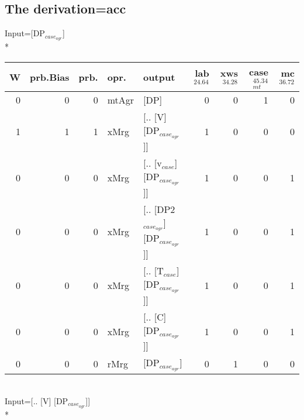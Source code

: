 \subsection{The derivation=acc}
\begingroup\scriptsize Input=[DP$_{case_{agr}}$]\\*
\begin{tabularx}{\linewidth}{rrrlXrrrr}
\hline
   W &   prb.Bias &   prb. & opr.    & output                            &   lab$^{24.64}$ &   xws$^{34.28}$ &   case$_{mt}^{45.34}$ &   mc$^{36.72}$ \\
\hline
   0 &       0 &   0 & mtAgr & [DP]                              &             0 &             0 &                 1 &            0 \\
   1 &       1 &   1 & xMrg  & [.. [V] [DP$_{case_{agr}}$]]            &             1 &             0 &                 0 &            0 \\
   0 &       0 &   0 & xMrg  & [.. [v$_{case}$] [DP$_{case_{agr}}$]]       &             1 &             0 &                 0 &            1 \\
   0 &       0 &   0 & xMrg  & [.. [DP2$_{case_{agr}}$] [DP$_{case_{agr}}$]] &             1 &             0 &                 0 &            1 \\
   0 &       0 &   0 & xMrg  & [.. [T$_{case}$] [DP$_{case_{agr}}$]]       &             1 &             0 &                 0 &            1 \\
   0 &       0 &   0 & xMrg  & [.. [C] [DP$_{case_{agr}}$]]            &             1 &             0 &                 0 &            1 \\
   0 &       0 &   0 & rMrg  & [DP$_{case_{agr}}$]                     &             0 &             1 &                 0 &            0 \\
\hline
\end{tabularx}\endgroup\\
\begingroup\scriptsize Input=[.. [V] [DP$_{case_{agr}}$]]\\*
